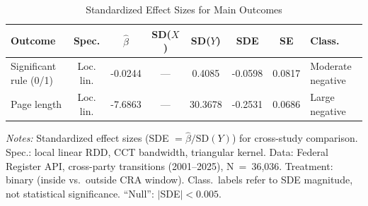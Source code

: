 \begin{table}[H]
\centering
\caption{Standardized Effect Sizes for Main Outcomes}
\label{tab:sde}
\begin{threeparttable}
\footnotesize
\begin{tabular}{lccccccl}
\toprule
Outcome & Spec. & $\hat{\beta}$ & SD($X$) & SD($Y$) & SDE & SE & Class. \\
\midrule
Significant rule (0/1) & Loc. lin. & -0.0244 & --- & 0.4085 & -0.0598 & 0.0817 & Moderate negative \\
Page length & Loc. lin. & -7.6863 & --- & 30.3678 & -0.2531 & 0.0686 & Large negative \\
\bottomrule
\end{tabular}
\begin{tablenotes}[flushleft]
\footnotesize
\item \textit{Notes:} Standardized effect sizes (SDE $= \hat{\beta} / \text{SD}(Y)$) for cross-study comparison. Spec.: local linear RDD, CCT bandwidth, triangular kernel. Data: Federal Register API, cross-party transitions (2001--2025), N~=~36,036. Treatment: binary (inside vs.\ outside CRA window). Class.\ labels refer to SDE magnitude, not statistical significance. ``Null'': $|$SDE$|<0.005$.
\end{tablenotes}
\end{threeparttable}
\end{table}
